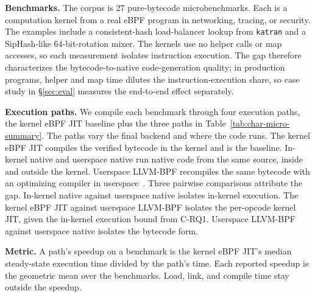 \noindent\textbf{Benchmarks.}
The corpus is 27 pure-bytecode microbenchmarks.
Each is a computation kernel from a real eBPF program in networking, tracing, or security.
The examples include a consistent-hash load-balancer lookup from \texttt{katran} and a SipHash-like 64-bit-rotation mixer.
The kernels use no helper calls or map accesses, so each measurement isolates instruction execution.
The gap therefore characterizes the bytecode-to-native code-generation quality; in production programs, helper and map time dilutes the instruction-execution share, so case study in \S\ref{sec:eval} measures the end-to-end effect separately.

\noindent\textbf{Execution paths.}
We compile each benchmark through four execution paths, the kernel eBPF JIT baseline plus the three paths in Table~\ref{tab:char-micro-summary}.
The paths vary the final backend and where the code runs.
The kernel eBPF JIT compiles the verified bytecode in the kernel and is the baseline.
In-kernel native and userspace native run native code from the same source, inside and outside the kernel.
Userspace LLVM-BPF recompiles the same bytecode with an optimizing compiler in userspace~\cite{zheng2025extending}.
Three pairwise comparisons attribute the gap.
In-kernel native against userspace native isolates in-kernel execution.
The kernel eBPF JIT against userspace LLVM-BPF isolates the per-opcode kernel JIT, given the in-kernel execution bound from C-RQ1.
Userspace LLVM-BPF against userspace native isolates the bytecode form.

\noindent\textbf{Metric.}
A path's speedup on a benchmark is the kernel eBPF JIT's median steady-state execution time divided by the path's time.
Each reported speedup is the geometric mean over the benchmarks.
Load, link, and compile time stay outside the speedup.

